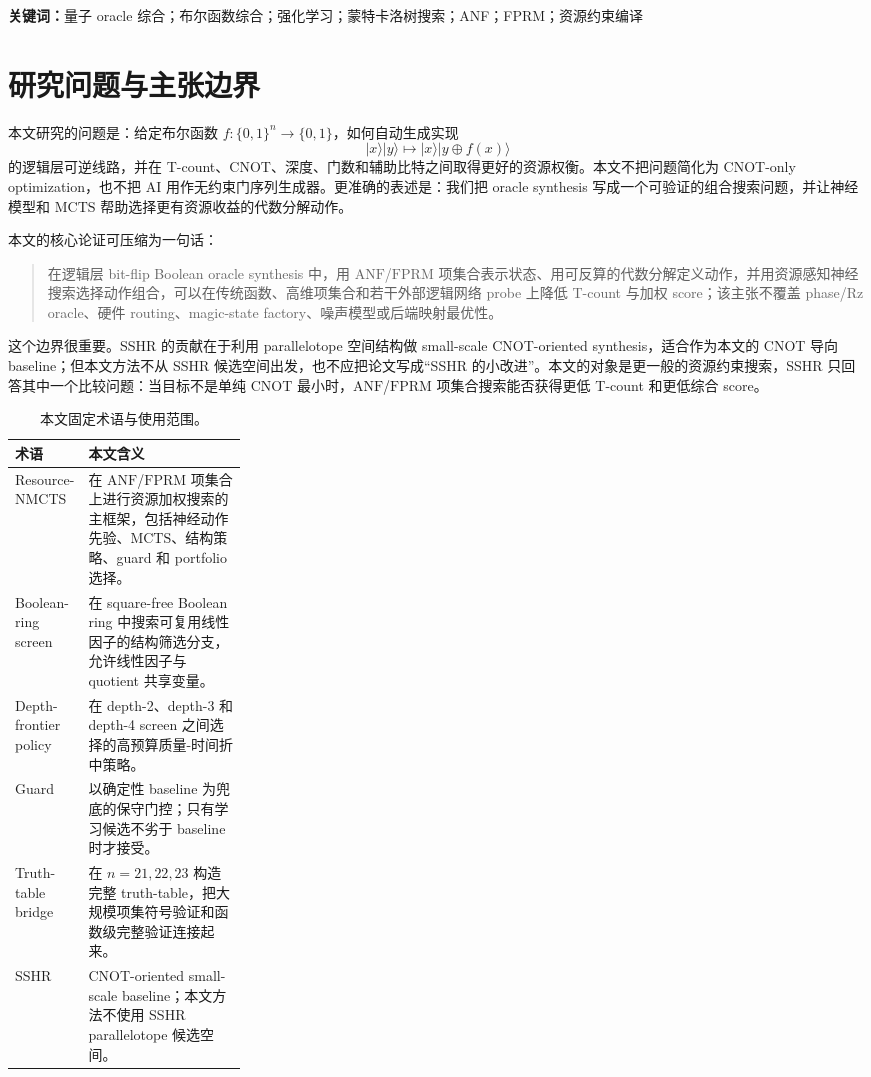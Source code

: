 \documentclass[UTF8,fontset=macnew,11pt]{ctexart}
\newcommand{\method}{Resource-NMCTS}
\newcommand{\anf}{\ensuremath{\mathrm{ANF}}}
\newcommand{\fprm}{\ensuremath{\mathrm{FPRM}}}
\newcommand{\mcts}{\ensuremath{\mathrm{MCTS}}}
\newcommand{\xor}{\ensuremath{\oplus}}
\newcommand{\ttable}{truth-table}
\begin{document}
\noindent\textbf{关键词：}量子 oracle 综合；布尔函数综合；强化学习；蒙特卡洛树搜索；ANF；FPRM；资源约束编译

\section{研究问题与主张边界}

本文研究的问题是：给定布尔函数 $f:\{0,1\}^n\rightarrow\{0,1\}$，如何自动生成实现
\begin{equation}
  |x\rangle |y\rangle \mapsto |x\rangle |y\xor f(x)\rangle
  \label{eq:oracle}
\end{equation}
的逻辑层可逆线路，并在 T-count、CNOT、深度、门数和辅助比特之间取得更好的资源权衡。本文不把问题简化为 CNOT-only optimization，也不把 AI 用作无约束门序列生成器。更准确的表述是：我们把 oracle synthesis 写成一个可验证的组合搜索问题，并让神经模型和 \mcts{} 帮助选择更有资源收益的代数分解动作。

本文的核心论证可压缩为一句话：

\begin{quote}
在逻辑层 bit-flip Boolean oracle synthesis 中，用 \anf{}/\fprm{} 项集合表示状态、用可反算的代数分解定义动作，并用资源感知神经搜索选择动作组合，可以在传统函数、高维项集合和若干外部逻辑网络 probe 上降低 T-count 与加权 score；该主张不覆盖 phase/Rz oracle、硬件 routing、magic-state factory、噪声模型或后端映射最优性。
\end{quote}

这个边界很重要。SSHR 的贡献在于利用 parallelotope 空间结构做 small-scale CNOT-oriented synthesis\cite{zheng2025sshr}，适合作为本文的 CNOT 导向 baseline；但本文方法不从 SSHR 候选空间出发，也不应把论文写成“SSHR 的小改进”。本文的对象是更一般的资源约束搜索，SSHR 只回答其中一个比较问题：当目标不是单纯 CNOT 最小时，\anf{}/\fprm{} 项集合搜索能否获得更低 T-count 和更低综合 score。

\begin{table}[H]
\centering
\small
\caption{本文固定术语与使用范围。}
\label{tab:terms}
\begin{tabularx}{\linewidth}{>{\raggedright\arraybackslash}p{0.27\linewidth}>{\raggedright\arraybackslash}X}
\toprule
术语 & 本文含义 \\
\midrule
\method{} & 在 \anf{}/\fprm{} 项集合上进行资源加权搜索的主框架，包括神经动作先验、\mcts{}、结构策略、guard 和 portfolio 选择。 \\
Boolean-ring screen & 在 square-free Boolean ring 中搜索可复用线性因子的结构筛选分支，允许线性因子与 quotient 共享变量。 \\
Depth-frontier policy & 在 depth-2、depth-3 和 depth-4 screen 之间选择的高预算质量-时间折中策略。 \\
Guard & 以确定性 baseline 为兜底的保守门控；只有学习候选不劣于 baseline 时才接受。 \\
Truth-table bridge & 在 $n=21,22,23$ 构造完整 \ttable{}，把大规模项集符号验证和函数级完整验证连接起来。 \\
SSHR & CNOT-oriented small-scale baseline；本文方法不使用 SSHR parallelotope 候选空间。 \\
\bottomrule
\end{tabularx}
\end{table}
\end{document}
